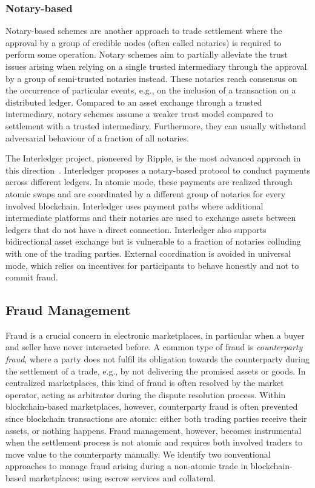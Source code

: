 \subsubsection{Notary-based}
Notary-based schemes are another approach to trade settlement where the approval by a group of credible nodes (often called notaries) is required to perform some operation.
Notary schemes aim to partially alleviate the trust issues arising when relying on a single trusted intermediary through the approval by a group of semi-trusted notaries instead.
These notaries reach consensus on the occurrence of particular events, e.g., on the inclusion of a transaction on a distributed ledger.
Compared to an asset exchange through a trusted intermediary, notary schemes assume a weaker trust model compared to settlement with a trusted intermediary. Furthermore, they can usually withstand adversarial behaviour of a fraction of all notaries.

The Interledger project, pioneered by Ripple, is the most advanced approach in this direction~\cite{thomas2015protocol}.
Interledger proposes a notary-based protocol to conduct payments across different ledgers.
In atomic mode, these payments are realized through atomic swaps and are coordinated by a different group of notaries for every involved blockchain.
Interledger uses payment paths where additional intermediate platforms and their notaries are used to exchange assets between ledgers that do not have a direct connection.
Interledger also supports bidirectional asset exchange but is vulnerable to a fraction of notaries colluding with one of the trading parties.
External coordination is avoided in universal mode, which relies on incentives for participants to behave honestly and not to commit fraud.

\subsection{Fraud Management}
Fraud is a crucial concern in electronic marketplaces, in particular when a buyer and seller have never interacted before.
A common type of fraud is \emph{counterparty fraud}, where a party does not fulfil its obligation towards the counterparty during the settlement of a trade, e.g., by not delivering the promised assets or goods.
In centralized marketplaces, this kind of fraud is often resolved by the market operator, acting as arbitrator during the dispute resolution process.
Within blockchain-based marketplaces, however, counterparty fraud is often prevented since blockchain transactions are atomic: either both trading parties receive their assets, or nothing happens.
Fraud management, however, becomes instrumental when the settlement process is not atomic and requires both involved traders to move value to the counterparty manually. %
We identify two conventional approaches to manage fraud arising during a non-atomic trade in blockchain-based marketplaces: using escrow services and collateral.

